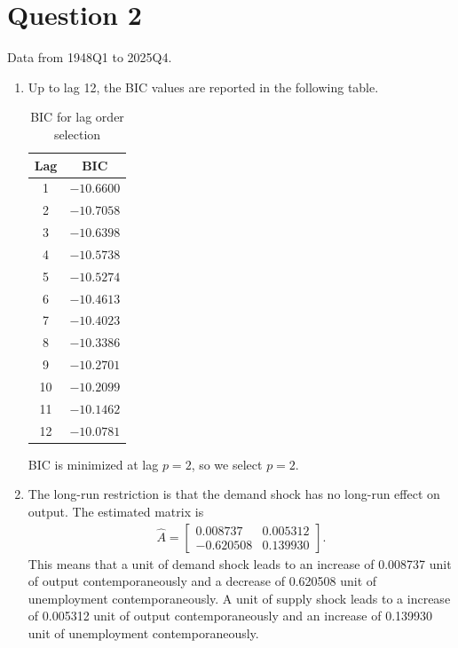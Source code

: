 \documentclass[12pt]{article}
\begin{document}
\newpage
\section*{Question 2}
Data from 1948Q1 to 2025Q4.
\begin{enumerate}[label=\alph*.]
    \item Up to lag 12, the BIC values are reported in the following table.
    \begin{table}[H]
        \centering
        \caption{BIC for lag order selection}
        \label{tab:q2a_bic}
        \begin{tabular}{cc}
            \toprule
            Lag & BIC \\
            \midrule
            1 & $-10.6600$ \\
            2 & $-10.7058$ \\
            3 & $-10.6398$ \\
            4 & $-10.5738$ \\
            5 & $-10.5274$ \\
            6 & $-10.4613$ \\
            7 & $-10.4023$ \\
            8 & $-10.3386$ \\
            9 & $-10.2701$ \\
            10 & $-10.2099$ \\
            11 & $-10.1462$ \\
            12 & $-10.0781$ \\
            \bottomrule
        \end{tabular}
    \end{table}
    BIC is minimized at lag $p = 2$, so we select $p = 2$.

    \item The long-run restriction is that the demand shock has no long-run effect on output. The estimated matrix is
    \begin{align*}
        \hat{A} = \begin{bmatrix}
            0.008737 & 0.005312 \\
            -0.620508 & 0.139930
        \end{bmatrix}.
    \end{align*}
    This means that a unit of demand shock leads to an increase of 0.008737 unit of output contemporaneously and a decrease of 0.620508 unit of unemployment contemporaneously. A unit of supply shock leads to a increase of 0.005312 unit of output contemporaneously and an increase of 0.139930 unit of unemployment contemporaneously.


\end{enumerate}
\end{document}

